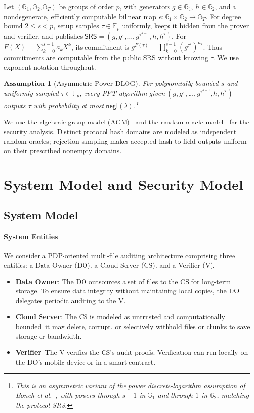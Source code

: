 \documentclass[lettersize,journal]{IEEEtran}
\newtheorem{assumption}{Assumption}
\newcommand{\GG}{\mathbb{G}}
\newcommand{\FF}{\mathbb{F}}
\newcommand{\SRS}{\mathsf{SRS}}
\begin{document}
Let $(\GG_1,\GG_2,\GG_T)$ be groups of order $p$, with generators $g\in\GG_1$, $h\in\GG_2$, and a nondegenerate, efficiently computable bilinear map $e:\GG_1\times\GG_2\to\GG_T$. For degree bound $2\leq s<p$, setup samples $\tau\in\FF_p$ uniformly, keeps it hidden from the prover and verifier, and publishes $\SRS=(g,g^\tau,\ldots,g^{\tau^{s-1}},h,h^\tau)$. For $F(X)=\sum_{k=0}^{s-1}a_kX^k$, its commitment is $g^{F(\tau)}=\prod_{k=0}^{s-1}(g^{\tau^k})^{a_k}$. Thus commitments are computable from the public SRS without knowing $\tau$. We use exponent notation throughout.

\begin{assumption}[Asymmetric Power-DLOG]\label{ass:power_dlog}
For polynomially bounded $s$ and uniformly sampled $\tau\in\FF_p$, every PPT algorithm given $(g,g^\tau,\ldots,g^{\tau^{s-1}},h,h^\tau)$ outputs $\tau$ with probability at most $\mathsf{negl}(\lambda)$.\footnote{This is an asymmetric variant of the power discrete-logarithm assumption of Boneh et al.~\cite[Def.~2.1]{Boneh2020PCS}, with powers through $s-1$ in $\GG_1$ and through $1$ in $\GG_2$, matching the protocol SRS.}
\end{assumption}

We use the algebraic group model (AGM)~\cite{Fuchsbauer2018AGM} and the random-oracle model~\cite{BellareRogaway1993} for the security analysis. Distinct protocol hash domains are modeled as independent random oracles; rejection sampling makes accepted hash-to-field outputs uniform on their prescribed nonempty domains.



\section{System Model and Security Model}

\subsection{System Model}
\paragraph{System Entities}
We consider a PDP-oriented multi-file auditing architecture comprising three entities: a Data Owner (DO), a Cloud Server (CS), and a Verifier (V).
\begin{itemize}
    \item \textbf{Data Owner}: The DO outsources a set of files to the CS for long-term storage. To ensure data integrity without maintaining local copies, the DO delegates periodic auditing to the V.
    \item \textbf{Cloud Server}: The CS is modeled as untrusted and computationally bounded: it may delete, corrupt, or selectively withhold files or chunks to save storage or bandwidth.
    \item \textbf{Verifier}: The V verifies the CS's audit proofs. Verification can run locally on the DO's mobile device or in a smart contract.
\end{itemize}
\end{document}
